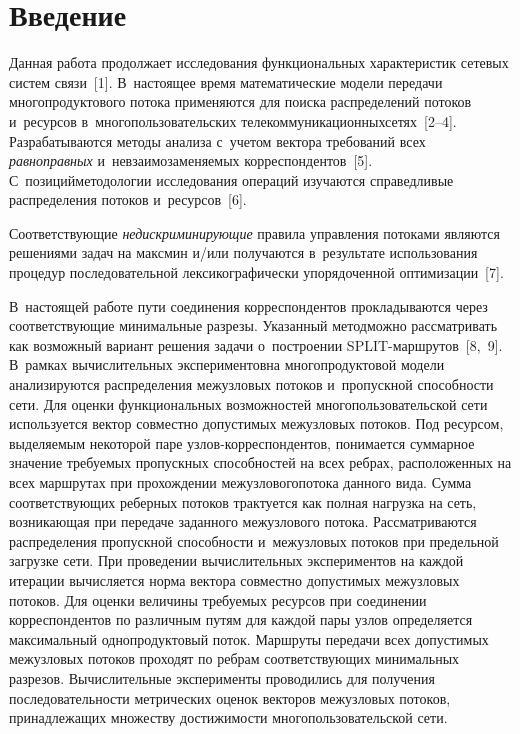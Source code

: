 \thispagestyle{headings}

\begin{multicols}{2}

\label{st\stat}

\section{Введение}

Данная работа продолжает исследования функциональных характеристик
сетевых сис\-тем связи~[1]. В~настоящее время математические модели
передачи многопродуктового потока применяются для поиска
распределений потоков и~ресурсов в~многопользовательских
телекоммуникационных\linebreak сетях~[2--4]. Разрабатываются методы анализа
с~учетом вектора требований всех \textit{равноправных} 
и~невзаимозаменяемых корреспондентов~[5]. С~позиций\linebreak методологии
исследования операций изучаются справедливые распределения потоков
и~ресурсов~[6].

Соответствующие \textit{недискриминирующие} правила управления
потоками являются решениями задач на максмин и/или получаются 
в~результате использования процедур последовательной
лексикографически упорядоченной оптимизации~[7].

В~настоящей работе пути соединения корреспондентов прокладываются
через со\-от\-вет\-ст\-ву\-ющие минимальные разрезы. Указанный метод\linebreak \mbox{можно}
рассматривать как возможный вариант решения задачи о~построении
SPLIT-марш\-ру\-тов~[8,~9]. В~рамках вычислительных экспериментов\linebreak на
многопродуктовой модели анализируются распределения межузловых
потоков  и~пропускной способ\-ности сети.  Для оценки функциональных
возможностей многопользовательской сети используется вектор
совместно допустимых межузловых потоков. Под ресурсом, выделяемым
некоторой паре узлов-кор\-рес\-пон\-ден\-тов,  понимается суммарное
значение тре\-бу\-емых пропускных способностей на всех ребрах,
расположенных на всех маршрутах при прохождении межузлового\linebreak потока
данного вида.  Сумма соответствующих реберных потоков трактуется
как полная нагрузка на сеть, возникающая при передаче заданного
межузлового потока. Рас\-смат\-ри\-ва\-ют\-ся распределения пропускной
способности и~межузловых потоков при предельной загрузке сети.
При проведении вычислительных экспериментов на каждой  итерации
вычисляется норма  вектора совместно допустимых межузловых
потоков.   Для оценки величины требуемых ресурсов при соединении
корреспондентов по различным путям для каж\-дой пары узлов
определяется максимальный однопродуктовый поток. Марш\-ру\-ты передачи
всех допустимых межузловых потоков  проходят по ребрам
соответствующих минимальных разрезов. Вычислительные эксперименты
проводились  для получения последовательности  мет\-ри\-че\-ских оценок
векторов межузловых потоков, принадлежащих множеству до\-сти\-жи\-мости
многопользовательской сети.


\end{multicols}
